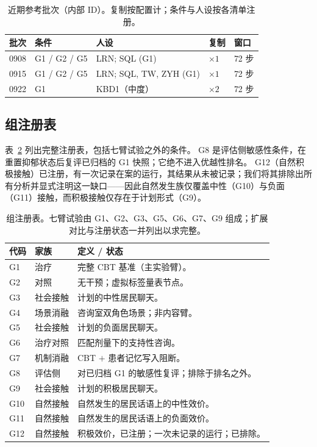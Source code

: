 \documentclass[11pt,a4paper]{article}
\begin{document}
\begin{table}[h]
\centering
\caption{近期参考批次（内部 ID）。复制按配置计；条件与人设按各清单注册。}
\label{tab:batches}
\small
\begin{tabular}{@{}lllll@{}}
\toprule
批次 & 条件 & 人设 & 复制 & 窗口 \\
\midrule
0908 & G1 / G2 / G5 & LRN; SQL (G1) & $\times 1$ & 72 步 \\
0915 & G1 / G2 / G5 & LRN; SQL, TW, ZYH (G1) & $\times 1$ & 72 步 \\
0922 & G1 & KBD1（中度） & $\times 2$ & 72 步 \\
\bottomrule
\end{tabular}
\end{table}

\subsection{组注册表}

表~\ref{tab:registry} 列出完整注册表，包括七臂试验之外的条件。
G8 是评估侧敏感性条件，在重置抑郁状态后复评已归档的 G1 快照；它绝不进入优越性排名。
G12（自然积极接触）已注册，有一次记录在案的运行，其结果从未被记录；我们将其排除出所有分析并显式注明这一缺口——因此自然发生族仅覆盖中性（G10）与负面（G11）接触，而积极接触仅存在于计划形式（G9）。

\begin{table}[h]
\centering
\caption{组注册表。七臂试验由 G1、G2、G3、G5、G6、G7、G9 组成；扩展对比与注册状态一并列出以求完整。}
\label{tab:registry}
\small
\begin{tabular}{@{}llp{8.6cm}@{}}
\toprule
代码 & 家族 & 定义 / 状态 \\
\midrule
G1 & 治疗 & 完整 CBT 基准（主实验臂）。 \\
G2 & 对照 & 无干预；虚拟标签量表节点。 \\
G3 & 社会接触 & 计划的中性居民聊天。 \\
G4 & 场景消融 & 咨询室双角色场景；非内容臂。 \\
G5 & 社会接触 & 计划的负面居民聊天。 \\
G6 & 治疗对照 & 匹配剂量下的支持性咨询。 \\
G7 & 机制消融 & CBT $+$ 患者记忆写入阻断。 \\
G8 & 评估侧 & 对已归档 G1 的敏感性复评；排除于排名之外。 \\
G9 & 社会接触 & 计划的积极居民聊天。 \\
G10 & 自然接触 & 自然发生的居民话语上的中性效价。 \\
G11 & 自然接触 & 自然发生的居民话语上的负面效价。 \\
G12 & 自然接触 & 积极效价，已注册；一次未记录的运行；已排除。 \\
\bottomrule
\end{tabular}
\end{table}
\end{document}
